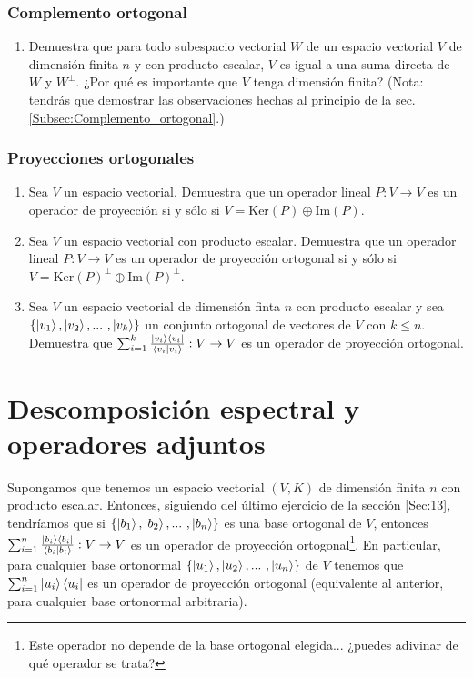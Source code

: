 \documentclass[12pt,libertine]{book}
\begin{document}
\subsubsection*{Complemento ortogonal} \label{Ejer:Complemento_ortogonal}
\begin{enumerate}
    \item Demuestra que para todo subespacio vectorial $W$ de un espacio vectorial $V$ de dimensión finita $n$ y con producto escalar, $V$ es igual a una suma directa de $W$ y $W^{\perp}.$ ¿Por qué es importante que $V$ tenga dimensión finita? (Nota: tendrás que demostrar las observaciones hechas al principio de la sec. \ref{Subsec:Complemento_ortogonal}.)
\end{enumerate}

\subsubsection*{Proyecciones ortogonales} \label{Ejer:Proyecciones_ortogonales}
\begin{enumerate}
    \item Sea $V$ un espacio vectorial. Demuestra que un operador lineal $P:V\to V$ es un operador de proyección si y sólo si $V=\text{Ker}(P)\oplus\text{Im}(P)$.
    \item Sea $V$ un espacio vectorial con producto escalar. Demuestra que un operador lineal $P:V\to V$ es un operador de proyección ortogonal si y sólo si $V=\text{Ker}(P)^\perp\oplus\text{Im}(P)^\perp$.
    \item Sea $V$ un espacio vectorial de dimensión finta $n$ con producto escalar y sea $\{\ket{v_1},\ket{v_2},... \ ,\ket{v_k}\}$ un conjunto ortogonal de vectores de $V$ con $k\le n$. Demuestra que $\sum_{i=1}^k\frac{\ket{v_i}\bra{v_i}}{\braket{v_i|v_i}}:V\to V$ es un operador de proyección ortogonal.
\end{enumerate}

\newpage
\section{Descomposición espectral y operadores adjuntos} \label{Sec:14} 


Supongamos que tenemos un espacio vectorial $(V,K)$ de dimensión finita $n$ con producto escalar. Entonces, siguiendo del último ejercicio de la sección \ref{Sec:13}, tendríamos que si $\{\ket{b_1},\ket{b_2},... \ ,\ket{b_n}\}$ es una base ortogonal de $V$, entonces $\sum_{i=1}^n \frac{\ket{b_i}\bra{b_i}}{\braket{b_i|b_i}}:V\to V$ es un operador de proyección ortogonal\footnote{Este operador no depende de la base ortogonal elegida... ¿puedes adivinar de qué operador se trata?}. En particular, para cualquier base ortonormal $\{\ket{u_1},\ket{u_2},... \ ,\ket{u_n}\}$ de $V$ tenemos que $\sum_{i=1}^n\ket{u_i}\bra{u_i}$ es un operador de proyección ortogonal (equivalente al anterior, para cualquier base ortonormal arbitraria).
\end{document}
